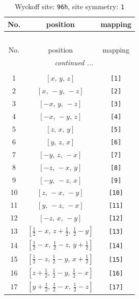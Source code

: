 \documentclass[fleqn,8pt]{jsarticle}
\begin{document}
\begin{longtable}{ccc}
\caption{Wyckoff site: {\tt 96h}, site symmetry: {\tt 1}}
 \\
 \hline \hline
No. & position & mapping \\ \hline \endfirsthead

\multicolumn{2}{l}{\tablename\ \thetable{}} \\
 \hline \hline
No. & position & mapping \\ \hline \endhead

 \hline \hline
\multicolumn{2}{r}{\footnotesize\it continued ...} \\ \endfoot

 \hline \hline
\multicolumn{2}{r}{} \\ \endlastfoot

1 & $\left[ x,\, y,\, z \right]$ & {\tt [1]} \\ \hline
2 & $\left[ x,\, - y,\, - z \right]$ & {\tt [2]} \\ \hline
3 & $\left[ - x,\, y,\, - z \right]$ & {\tt [3]} \\ \hline
4 & $\left[ - x,\, - y,\, z \right]$ & {\tt [4]} \\ \hline
5 & $\left[ z,\, x,\, y \right]$ & {\tt [5]} \\ \hline
6 & $\left[ y,\, z,\, x \right]$ & {\tt [6]} \\ \hline
7 & $\left[ - y,\, z,\, - x \right]$ & {\tt [7]} \\ \hline
8 & $\left[ - z,\, - x,\, y \right]$ & {\tt [8]} \\ \hline
9 & $\left[ - y,\, - z,\, x \right]$ & {\tt [9]} \\ \hline
10 & $\left[ z,\, - x,\, - y \right]$ & {\tt [10]} \\ \hline
11 & $\left[ y,\, - z,\, - x \right]$ & {\tt [11]} \\ \hline
12 & $\left[ - z,\, x,\, - y \right]$ & {\tt [12]} \\ \hline
13 & $\left[ \frac{1}{2} - x,\, z + \frac{1}{2},\, \frac{1}{2} - y \right]$ & {\tt [13]} \\ \hline
14 & $\left[ \frac{1}{2} - x,\, \frac{1}{2} - z,\, y + \frac{1}{2} \right]$ & {\tt [14]} \\ \hline
15 & $\left[ \frac{1}{2} - z,\, \frac{1}{2} - y,\, x + \frac{1}{2} \right]$ & {\tt [15]} \\ \hline
16 & $\left[ z + \frac{1}{2},\, \frac{1}{2} - y,\, \frac{1}{2} - x \right]$ & {\tt [16]} \\ \hline
17 & $\left[ y + \frac{1}{2},\, \frac{1}{2} - x,\, \frac{1}{2} - z \right]$ & {\tt [17]} \\ \hline

\end{longtable}
\end{document}
